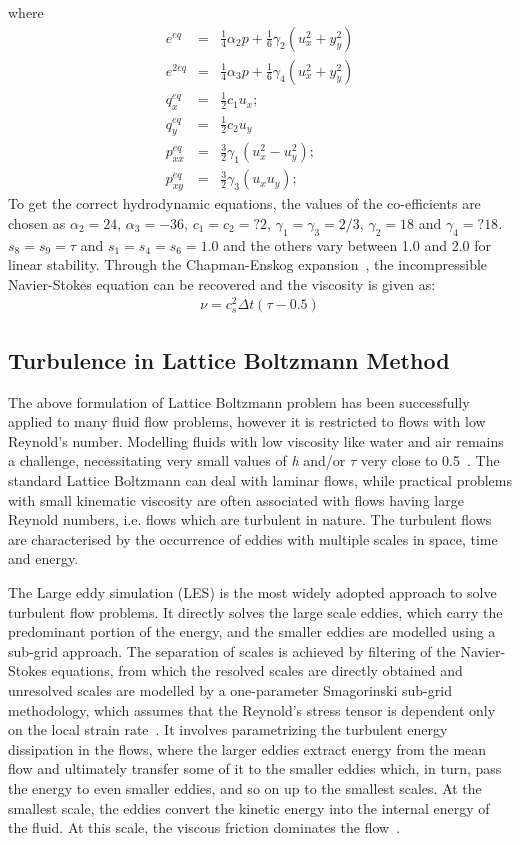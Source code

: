 \noindent where
\begin{align}
e^{eq} & = &\frac{1}{4}\alpha_2p+\frac{1}{6}\gamma_2(u_x^2+y_y^2)\\
e^{2eq} & = & \frac{1}{4}\alpha_3p+\frac{1}{6}\gamma_4(u_x^2+y_y^2)\\
q_x^{eq} & = & \frac{1}{2}c_1u_x;\\
q_y^{eq} & = & \frac{1}{2}c_2u_y \\
p_{xx}^{eq} & = & \frac{3}{2}\gamma_1(u_x^2 - u_y^2);\\
p_{xy}^{eq} & = & \frac{3}{2}\gamma_3(u_xu_y);
\end{align}
To get the correct hydrodynamic equations, the values of the co-efficients are chosen as $\alpha_2=24$,  $\alpha_3=-36$, $c_1=c_2=?2$, $\gamma_1=\gamma_3=2/3$, $\gamma_2=18$ and $\gamma_4=?18$. $s_8 = s_9 = \tau$ and $s_1=s_4=s_6=1.0$ and the others vary between 1.0 and 2.0 for linear stability. Through the Chapman-Enskog expansion~\citep{Du2006}, the incompressible Navier-Stokes equation can be recovered and the viscosity is given as:
\begin{align}
\nu=c_s^2\Delta t(\tau-0.5)
\end{align}

\subsection{Turbulence in Lattice Boltzmann Method}
The above formulation of Lattice Boltzmann problem has been successfully applied to many fluid flow problems, however it is restricted to flows with low Reynold's number. Modelling fluids with low viscosity like water and air remains a challenge, necessitating very small values of \textit{h} and/or $\tau$ very close to 0.5~\citep{He1997}. The standard Lattice Boltzmann can deal with laminar flows, while practical problems with small kinematic viscosity are often associated with flows having large Reynold numbers, i.e. flows which are turbulent in nature. The turbulent flows are characterised by the occurrence of eddies with multiple scales in space, time and energy.

The Large eddy simulation (LES) is the most widely adopted approach to solve turbulent flow problems. It directly solves the large scale eddies, which carry the predominant portion of the energy, and the smaller eddies are modelled using a sub-grid approach. The separation of scales is achieved by filtering of the Navier-Stokes equations, from which the resolved scales are directly obtained and unresolved scales are modelled by a one-parameter Smagorinski sub-grid methodology, which assumes that the Reynold's stress tensor is dependent only on the local strain rate~\citep{Smagorinsky1963}. It involves parametrizing the turbulent energy dissipation in the flows, where the larger eddies extract energy from the mean flow and ultimately transfer some of it to the smaller eddies which, in turn, pass the energy to even smaller eddies, and so on up to the smallest scales. At the smallest scale, the eddies convert the kinetic energy into the internal energy of the fluid. At this scale, the viscous friction dominates the flow~\citep{Frisch1995}.


